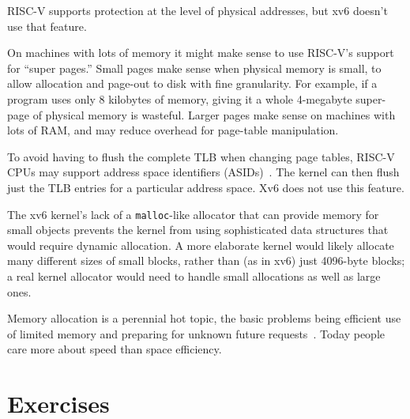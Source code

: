 RISC-V supports protection at the level of physical addresses,
but xv6 doesn't use that feature.

On machines with lots of memory
it might make sense to use
RISC-V's support for ``super pages.''
Small pages make sense
when physical memory is small, to allow allocation and page-out to disk
with fine granularity.
For example, if a program
uses only 8 kilobytes of memory, giving it a whole 4-megabyte super-page
of physical memory is wasteful.
Larger pages make sense on machines with lots of RAM,
and may reduce overhead for page-table manipulation.

To avoid having to flush the complete TLB when
changing page tables, RISC-V CPUs may support address
space identifiers (ASIDs)~\cite{riscv:priv}.  The kernel can then
flush just the TLB entries for a particular address space. Xv6
does not use this feature.

The xv6 kernel's lack of a {\tt malloc}-like allocator that can
provide memory for small objects prevents the kernel from using
sophisticated data structures that would require dynamic allocation.
A more elaborate kernel
would likely allocate many different sizes of small blocks,
rather than (as in xv6) just 4096-byte blocks;
a real kernel
allocator would need to handle small allocations as well as large
ones.

Memory allocation is a perennial hot topic, the basic problems being
efficient use of limited memory and
preparing for unknown future requests~\cite{knuth}.  Today people care more about speed than
space efficiency.
\section{Exercises}

